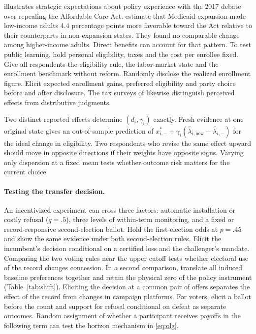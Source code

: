 \documentclass[11pt,letterpaper]{article}
\begin{document}
\citet{izzofuture} illustrates strategic expectations about policy experience with the 2017 debate over repealing the Affordable Care Act. \citet{hopkinsparish} estimate that Medicaid expansion made low-income adults 4.4 percentage points more favorable toward the Act relative to their counterparts in non-expansion states. They found no comparable change among higher-income adults. Direct benefits can account for that pattern. To test public learning, hold personal eligibility, taxes and the cost per enrollee fixed. Give all respondents the eligibility rule, the labor-market state and the enrollment benchmark without reform. Randomly disclose the realized enrollment figure. Elicit expected enrollment gains, preferred eligibility and party choice before and after disclosure. The tax surveys of \citet{stantchevatax} likewise distinguish perceived effects from distributive judgments.

Two distinct reported effects determine $(d_i,\gamma_i)$ exactly. Fresh evidence at one original state gives an out-of-sample prediction of $x^*_{i,-}+\gamma_i(\hat\lambda_{i,\mathrm{new}}-\hat\lambda_{i,-})$ for the ideal change in eligibility. Two respondents who revise the same effect upward should move in opposite directions if their weights have opposite signs. Varying only dispersion at a fixed mean tests whether outcome risk matters for the current choice.

\paragraph{Testing the transfer decision.}
An incentivized experiment can cross three factors: automatic installation or costly refusal ($q=.5$), three levels of within-term monitoring, and a fixed or record-responsive second-election ballot. Hold the first-election odds at $p=.45$ and show the same evidence under both second-election rules. Elicit the incumbent's decision conditional on a certified loss and the challenger's mandate. Comparing the two voting rules near the upper cutoff tests whether electoral use of the record changes concession. In a second comparison, translate all induced baseline preferences together and retain the physical zero of the policy instrument (Table~\ref{tab:shift}). Eliciting the decision at a common pair of offers separates the effect of the record from changes in campaign platforms. For voters, elicit a ballot before the count and support for refusal conditional on defeat as separate outcomes. Random assignment of whether a participant receives payoffs in the following term can test the horizon mechanism in \eqref{eq:olg}.
\end{document}
